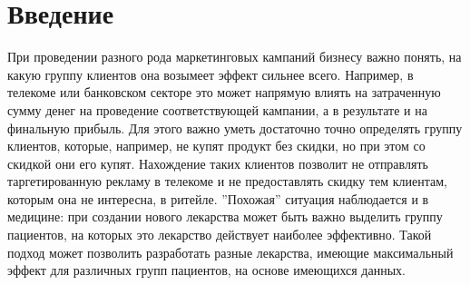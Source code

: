 \section{Введение}
\label{sec:intro}

При проведении разного рода маркетинговых кампаний бизнесу важно понять, на какую группу клиентов она возымеет эффект сильнее всего. Например, в телекоме или банковском секторе это может напрямую влиять на затраченную сумму денег на проведение соответствующей кампании, а в результате и на финальную прибыль. Для этого важно уметь достаточно точно определять группу клиентов, которые, например, не купят продукт без скидки, но при этом со скидкой они его купят. Нахождение таких клиентов позволит не отправлять таргетированную рекламу в телекоме и не предоставлять скидку тем клиентам, которым она не интересна, в ритейле. ''Похожая'' ситуация наблюдается и в медицине: при создании нового лекарства может быть важно выделить группу пациентов, на которых это лекарство действует наиболее эффективно. Такой подход может позволить разработать разные лекарства, имеющие максимальный эффект для различных групп пациентов, на основе имеющихся данных.

